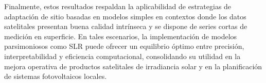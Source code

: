 \documentclass[letterpaper,12pt, twoside]{report}
\providecommand{\DIFdeltex}[1]{{\protect\color{red} \scriptsize #1}} %
\providecommand{\DIFdel}[1]{\texorpdfstring{\DIFdeltex{#1}}{}} %
\begin{document}
\DIFdel{Finalmente, estos resultados respaldan la aplicabilidad de estrategias de adaptación de sitio basadas en modelos simples en contextos donde los datos satelitales presentan buena calidad intrínseca y se dispone de series cortas de medición en superficie. En tales escenarios, la implementación de modelos parsimoniosos como SLR puede ofrecer un equilibrio óptimo entre precisión, interpretabilidad y eficiencia computacional, consolidando su utilidad en la mejora operativa de productos satelitales de irradiancia solar y en la planificación de sistemas fotovoltaicos locales.
}%





\end{document}
